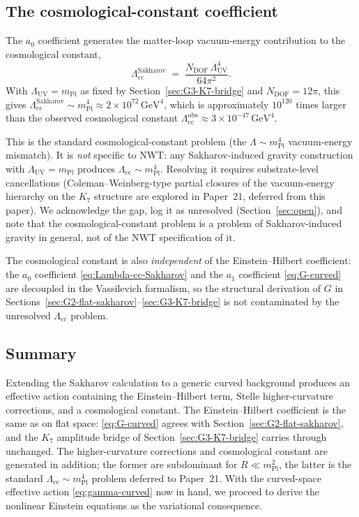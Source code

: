 \documentclass[11pt]{article}
\newcommand{\mPl}{m_{\mathrm{Pl}}}
\begin{document}
\subsection{The cosmological-constant coefficient}

The $a_0$ coefficient generates the matter-loop vacuum-energy
contribution to the cosmological constant,
\begin{equation}
  \Lambda_{\mathrm{cc}}^{\mathrm{Sakharov}}
   \;=\;
   \frac{N_{\mathrm{DOF}}\,\Lambda_{\mathrm{UV}}^4}{64\pi^2}.
  \label{eq:Lambda-cc-Sakharov}
\end{equation}
With $\Lambda_{\mathrm{UV}} = \mPl$ as fixed by
Section~\ref{sec:G3-K7-bridge} and $N_{\mathrm{DOF}} = 12\pi$,
this gives $\Lambda_{\mathrm{cc}}^{\mathrm{Sakharov}}
\sim \mPl^4 \approx 2 \times 10^{72}\,\mathrm{GeV}^4$,
which is approximately $10^{120}$ times larger than the observed
cosmological constant
$\Lambda_{\mathrm{cc}}^{\mathrm{obs}} \approx
3 \times 10^{-47}\,\mathrm{GeV}^4$.

This is the standard cosmological-constant problem (the $\Lambda
\sim \mPl^4$ vacuum-energy mismatch).  It is \emph{not} specific
to NWT: any Sakharov-induced gravity construction with
$\Lambda_{\mathrm{UV}} = \mPl$ produces $\Lambda_{\mathrm{cc}}
\sim \mPl^4$.  Resolving it requires substrate-level cancellations
(Coleman--Weinberg-type partial closures of the vacuum-energy
hierarchy on the $K_7$ structure are explored in Paper~21,
deferred from this paper).  We acknowledge the gap, log it as
unresolved (Section~\ref{sec:open}), and note that the
cosmological-constant problem is a problem of Sakharov-induced
gravity in general, not of the NWT specification of it.

The cosmological constant is also \emph{independent} of the
Einstein--Hilbert coefficient: the $a_0$ coefficient
\eqref{eq:Lambda-cc-Sakharov} and the $a_1$ coefficient
\eqref{eq:G-curved} are decoupled in the Vassilevich formalism, so
the structural derivation of $G$ in
Sections~\ref{sec:G2-flat-sakharov}--\ref{sec:G3-K7-bridge} is not
contaminated by the unresolved $\Lambda_{\mathrm{cc}}$ problem.

\subsection{Summary}

Extending the Sakharov calculation to a generic curved background
produces an effective action containing the Einstein--Hilbert
term, Stelle higher-curvature corrections, and a cosmological
constant.  The Einstein--Hilbert coefficient is the same as on
flat space: \eqref{eq:G-curved} agrees with
Section~\ref{sec:G2-flat-sakharov}, and the $K_7$ amplitude bridge
of Section~\ref{sec:G3-K7-bridge} carries through unchanged.  The
higher-curvature corrections and cosmological constant are
generated in addition; the former are subdominant for
$R \ll \mPl^2$, the latter is the standard
$\Lambda_{\mathrm{cc}} \sim \mPl^4$ problem deferred to Paper~21.
With the curved-space effective action
\eqref{eq:gamma-curved} now in hand, we proceed to derive the
nonlinear Einstein equations as the variational consequence.
\end{document}
